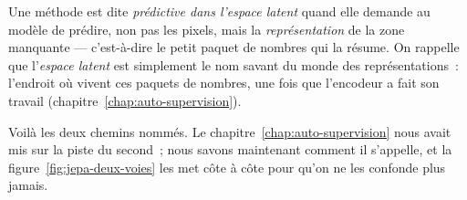 \begin{definition}
Une méthode est dite \emph{prédictive dans l'espace latent} quand elle
demande au modèle de prédire, non pas les pixels, mais la
\emph{représentation} de la zone manquante — c'est-à-dire le petit paquet de
nombres qui la résume. On rappelle que l'\emph{espace latent} est simplement
le nom savant du monde des représentations~: l'endroit où vivent ces paquets
de nombres, une fois que l'encodeur a fait son travail
(chapitre~\ref{chap:auto-supervision}).
\end{definition}

Voilà les deux chemins nommés. Le chapitre~\ref{chap:auto-supervision} nous
avait mis sur la piste du second~; nous savons maintenant comment il
s'appelle, et la figure~\ref{fig:jepa-deux-voies} les met côte à côte pour
qu'on ne les confonde plus jamais.

